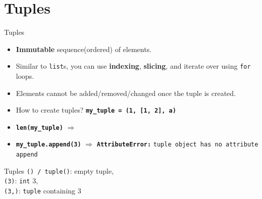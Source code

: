     

    \section{Tuples}
    \begin{frame}{Tuples}
        \LARGE
        \begin{itemize}
            \item \textbf{Immutable} sequence(ordered) of elements.
            \pause
            \item Similar to \texttt{list}s, you can use \textbf{indexing}, \textbf{slicing}, and iterate over using \texttt{for} loops.
            \pause
            \item Elements cannot be added/removed/changed once the tuple is created.
            \pause
            \item How to create tuples?
            \pause
             \textbf{\texttt{my\_tuple = (1, [1, 2], \textquotesingle a\textquotesingle )}}
            \pause
            \item \textbf{\texttt{len(my\_tuple)}} $\Rightarrow$
            \item \textbf{\texttt{my\_tuple.append(3)}} $\Rightarrow$
            \pause
             \textbf{\texttt{AttributeError:}} \texttt{\textquotesingle tuple\textquotesingle \ object has no attribute \textquotesingle append\textquotesingle}
        \end{itemize}
    \end{frame}

    \begin{frame}{Tuples}
        \Large
        \texttt{() / tuple()}: empty tuple, \\
        \pause
         \texttt{(3)}:
        \pause
         \texttt{int} 3,\\
        \pause
         \texttt{(3,)}:
        \pause
         \texttt{tuple} containing 3\\
        \pause
        \inputminted[frame=single,framesep=2pt]{python3}{code-examples/tuples.py}
    \end{frame}

